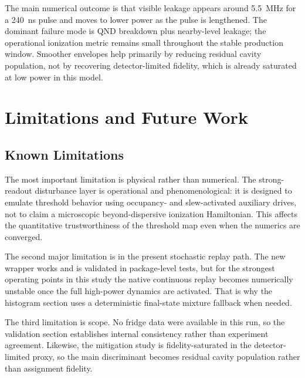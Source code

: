 \documentclass[11pt, a4paper]{article}
\begin{document}
The main numerical outcome is that visible leakage appears around \SI{5.5}{MHz} for a \SI{240}{ns} pulse and moves to lower power as the pulse is lengthened. The dominant failure mode is QND breakdown plus nearby-level leakage; the operational ionization metric remains small throughout the stable production window. Smoother envelopes help primarily by reducing residual cavity population, not by recovering detector-limited fidelity, which is already saturated at low power in this model.

\section{Limitations and Future Work}

\subsection{Known Limitations}
The most important limitation is physical rather than numerical. The strong-readout disturbance layer is operational and phenomenological: it is designed to emulate threshold behavior using occupancy- and slew-activated auxiliary drives, not to claim a microscopic beyond-dispersive ionization Hamiltonian. This affects the quantitative trustworthiness of the threshold map even when the numerics are converged.

The second major limitation is in the present stochastic replay path. The new
wrapper works and is validated in package-level tests, but for the strongest operating points in this study the native continuous replay becomes numerically unstable once the full high-power dynamics are activated. That is why the histogram section uses a deterministic final-state mixture fallback when needed.

The third limitation is scope. No fridge data were available in this run, so the validation section establishes internal consistency rather than experiment agreement. Likewise, the mitigation study is fidelity-saturated in the detector-limited proxy, so the main discriminant becomes residual cavity population rather than assignment fidelity.
\end{document}
